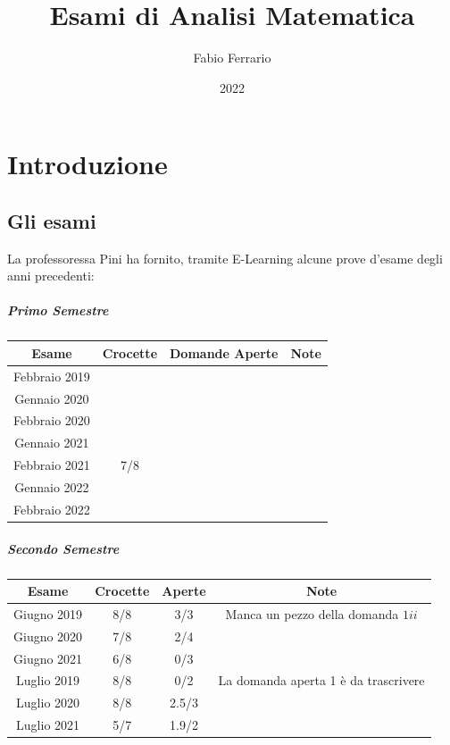 \documentclass[12pt, a4paper, openany]{book}
\begin{document}
\title{Esami di Analisi Matematica}
\author{Fabio Ferrario}
\date{2022}
\maketitle
\tableofcontents

\chapter{Introduzione}
\section{Gli esami}
La professoressa Pini ha fornito, tramite E-Learning alcune prove d'esame degli anni precedenti:
\paragraph*{Primo Semestre}
\begin{tabular}{ |c|c|c|c| }
	\hline
	Esame         & Crocette   & Domande Aperte & Note \\
	\hline
	Febbraio 2019 &            &                &      \\
	Gennaio 2020  &            &                &      \\
	Febbraio 2020 & \checkmark &                &      \\
	Gennaio 2021  &            &                &      \\
	Febbraio 2021 & 7/8        &                &      \\
	Gennaio 2022  &            &                &      \\
	Febbraio 2022 &            &                &      \\
	\hline
\end{tabular}
\paragraph*{Secondo Semestre}
\begin{tabular}{ |c|c|c|c| }
	\hline
	Esame       & Crocette & Aperte & Note                                 \\
	\hline
	Giugno 2019 & 8/8      & 3/3    & Manca un pezzo della domanda $1ii$   \\
	Giugno 2020 & 7/8      & 2/4    &                                      \\
	Giugno 2021 & 6/8      & 0/3    &                                      \\
	Luglio 2019 & 8/8      & 0/2    & La domanda aperta 1 è da trascrivere \\
	Luglio 2020 & 8/8      & 2.5/3  &                                      \\
	Luglio 2021 & 5/7      & 1.9/2  &                                      \\
	\hline
\end{tabular}
\end{document}
